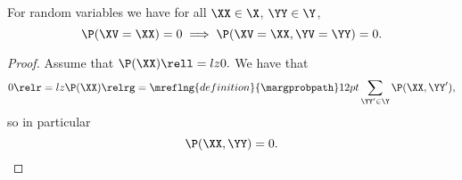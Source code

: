 \begin{proposition}
  For random variables 
  we have for all $\XX \in \X$, $\YY \in \Y$,
  $$\P(\XV = \XX)  = 0 \implies \P(\XV = \XX, \YV = \YY) = 0.$$%
\end{proposition}

\begin{proof}
  Assume that $\P(\XX) \rell = lz 0.$
  We have that
  $$0 \relr = lz \P(\XX) \relrg = \mreflng{definition}{\margprobpath} 12pt \sum_{\YY' \in \Y}\P(\XX, \YY'),$$
  so in particular
  $$\P(\XX, \YY) = 0.$$%
\end{proof}
